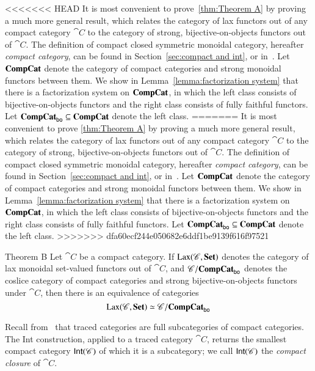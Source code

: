 \documentclass[12pt,oneside,article,draft]{memoir}
\begin{document}
\begin{enumerate}
<<<<<<< HEAD
It is most convenient to prove~\ref{thm:Theorem A} by proving a much more general result, which relates the category of lax functors out of any compact category $\cat{C}$ to the category of strong, bijective-on-objects functors out of $\cat{C}$.
The definition of compact closed symmetric monoidal category, hereafter \emph{compact category}, can be found in Section~\ref{sec:compact and int}, or in~\cite{}.
Let $\mathbf{CompCat}$ denote the category of compact categories and strong monoidal functors between them.
We show in Lemma~\ref{lemma:factorization system} that there is a factorization system on $\mathbf{CompCat}$, in which the left class consists of bijective-on-objects functors and the right class consists of fully faithful functors.
Let $\mathbf{CompCat}_{\mathsf{bo}}\subseteq\mathbf{CompCat}$ denote the left class. 
=======
It is most convenient to prove \ref{thm:Theorem A} by proving a much more general result, which relates the category of lax functors out of any compact category $\cat{C}$ to the category of strong, bijective-on-objects functors out of $\cat{C}$. The definition of compact closed symmetric monoidal category, hereafter \emph{compact category}, can be found in Section~\ref{sec:compact and int}, or in~\cite{MacLane}. Let $\mathbf{CompCat}$ denote the category of compact categories and strong monoidal functors between them. We show in Lemma~\ref{lemma:factorization system} that there is a factorization system on $\mathbf{CompCat}$, in which the left class consists of bijective-on-objects functors and the right class consists of fully faithful functors. Let $\mathbf{CompCat}_{\mathsf{bo}}\subseteq\mathbf{CompCat}$ denote the left class.
>>>>>>> dfa60ecf244e050682e6ddf1be9139f616f97521

\begin{named}{Theorem B}
	Let $\cat{C}$ be a compact category.
	If $\operatorname{Lax}(\mathscr{C},\mathbf{Set})$ denotes the category of lax monoidal set-valued functors out of $\cat{C}$, and $\mathscr{C}/\mathbf{CompCat}_{\mathsf{bo}}$ denotes the coslice category of compact categories and strong bijective-on-objects functors under $\cat{C}$, then there is an equivalence of categories
	\begin{equation}\label{dia:compact lax strong}
		\operatorname{Lax}(\mathscr{C},\mathbf{Set})\simeq\mathscr{C}/\mathbf{CompCat}_{\mathsf{bo}}
	\end{equation}
\end{named}

Recall from~\cite{JoyalStreetVerity} that traced categories are full subcategories of compact categories.
The Int construction, applied to a traced category $\cat{C}$, returns the smallest compact category $\mathsf{Int}(\mathscr{C})$ of which it is a subcategory; we call $\mathsf{Int}(\mathscr{C})$ the \emph{compact closure} of $\cat{C}$. 


\end{enumerate}
\end{document}
